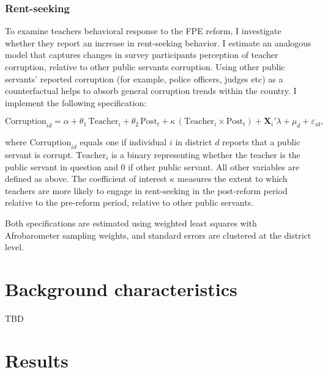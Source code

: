 \documentclass[hidelinks,12pt]{article}
\begin{document}
\begin{singlespace}
\subsubsection{Rent-seeking}
To examine teachers behavioral response to the FPE reform, I investigate whether they report an increase in rent-seeking behavior. I estimate an analogous model that captures changes in survey participants perception of teacher corruption, relative to other public servants corruption. Using other public servants' reported corruption (for example, police officers, judges etc) as a counterfactual helps to absorb general corruption trends within the country. I implement the following specification:  
\vspace{-1.5em}

\begin{equation}
    \label{eq:rentseeking}
    \text{Corruption}_{id} = \alpha + \theta_1 \, \text{Teacher}_{i} 
    + \theta_2 \, \text{Post}_{t} 
    + \kappa \, (\text{Teacher}_{i} \times \text{Post}_{t})
    + \mathbf{X}_{i}' \lambda 
    + \mu_{d} + \varepsilon_{id},
\end{equation}

where $\text{Corruption}_{id}$ equals one if individual $i$ in district $d$ reports that a public servant is corrupt. $\text{Teacher}_{i}$ is a binary representing whether the teacher is the public servant in question and 0 if other public servant. All other variables are defined as above. The coefficient of interest $\kappa$ measures the extent to which teachers are more likely to engage in rent-seeking in the post-reform period relative to the pre-reform period, relative to other public servants.  

Both specifications are estimated using weighted least squares with Afrobarometer sampling weights, and standard errors are clustered at the district level. 

\section{Background characteristics}

TBD


\section{Results}


\end{singlespace}

\newpage

\singlespacing


\printbibliography[title={References}] \pagebreak 
\end{document}
